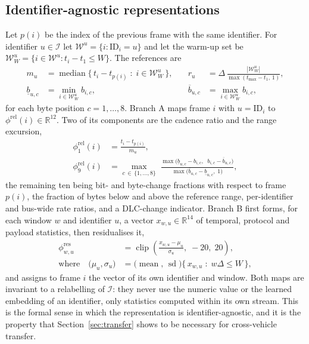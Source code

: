 \documentclass[preprint,11pt,authoryear]{elsarticle}
\newcommand{\phirel}{\phi^{\mathrm{rel}}}
\newcommand{\phires}{\phi^{\mathrm{res}}}
\begin{document}
\subsection{Identifier-agnostic representations}

Let $p(i)$ be the index of the previous frame with the same identifier. For identifier $u\in
\mathcal{I}$ let $\mathcal{W}^u=\{i:\mathrm{ID}_i=u\}$ and let the warm-up set be
$\mathcal{W}^u_W=\{i\in\mathcal{W}^u: t_i-t_1\le W\}$. The references are
\begin{align}
m_u &= \operatorname{median}\{\,t_i-t_{p(i)} \;:\; i\in\mathcal{W}^u_W\,\},
&\quad
r_u &= \Delta\,\frac{|\mathcal{W}^u_W|}{\max(t_{\max}-t_1,\,1)}, \label{eq:refs}\\[2pt]
\underline{b}_{u,c} &= \min_{i\in\mathcal{W}^u_W} b_{i,c},
&\quad
\overline{b}_{u,c} &= \max_{i\in\mathcal{W}^u_W} b_{i,c}, \nonumber
\end{align}
for each byte position $c=1,\dots,8$. Branch A maps frame $i$ with $u=\mathrm{ID}_i$ to
$\phirel(i)\in\mathbb{R}^{12}$. Two of its components are the cadence ratio and the range
excursion,
\begin{align}
\phirel_1(i) &= \frac{t_i-t_{p(i)}}{m_u}, \label{eq:rel}\\[2pt]
\phirel_9(i) &= \max_{c\,\in\,\{1,\dots,8\}}\;
\frac{\max\!\big(\underline{b}_{u,c}-b_{i,c},\;\; b_{i,c}-\overline{b}_{u,c}\big)}
{\max\!\big(\overline{b}_{u,c}-\underline{b}_{u,c},\;1\big)}, \label{eq:rel2}
\end{align}
the remaining ten being bit- and byte-change fractions with respect to frame $p(i)$, the fraction of
bytes below and above the reference range, per-identifier and bus-wide rate ratios, and a DLC-change
indicator. Branch B first forms, for each window $w$ and identifier $u$, a vector
$x_{w,u}\in\mathbb{R}^{14}$ of temporal, protocol and payload statistics, then residualises it,
\begin{align}
\phires_{w,u} &= \operatorname{clip}\!\left(\frac{x_{w,u}-\mu_u}{\sigma_u},\;-20,\;20\right),
\label{eq:res}\\[2pt]
\text{where}\quad \big(\mu_u,\sigma_u\big) &= \big(\operatorname{mean},\,\operatorname{sd}\big)
\big\{\,x_{w,u} \;:\; w\Delta\le W\,\big\},
\label{eq:resmu}
\end{align}
and assigns to frame $i$ the vector of its own identifier and window. Both maps are invariant to a
relabelling of $\mathcal{I}$: they never use the numeric value or the learned embedding of an
identifier, only statistics computed within its own stream. This is the formal sense in which the
representation is identifier-agnostic, and it is the property that Section~\ref{sec:transfer} shows
to be necessary for cross-vehicle transfer.
\end{document}
